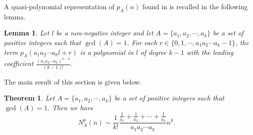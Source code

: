 \documentclass[11pt]{article}
\newtheorem{theorem}{Theorem}
\newtheorem{lemma}{Lemma}
\begin{document}
A quasi-polynomial representation of $p_A(n)$  found in \cite{david1} is recalled in the following lemma.
\begin{lemma}\label{lemma2}
Let $l$ be a non-negative integer and let $A=\{a_1,a_2,\cdots ,a_k\}$ be a set of positive integers such that $\gcd(A)=1$. For each $r\in\{0,1,\cdots,a_1a_2\cdots a_k-1\}$, the term $p_A(a_1a_2\cdots a_kl+r)$ is a polynomial in $l$ of degree $k-1$ with the leading coefficient $\frac{(a_1a_2\cdots a_k)^{k-2}}{(k-1)!}$.
\end{lemma}
The main result of this section is given below.
\begin{theorem}
Let $A=\{a_1,a_2,\cdots ,a_k\}$ be a set of positive integers such that $\gcd(A)=1$. Then we have
\begin{equation}\label{mest}
N_A^p(n)\sim\frac{1}{k!}\frac{\frac{1}{a_1}+\frac{1}{a_2}+\cdots +\frac{1}{a_k}}{a_1a_2\cdots a_k}n^k.
\end{equation}
\end{theorem}
\end{document}
